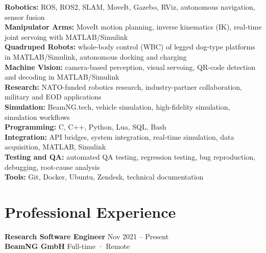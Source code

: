 \documentclass[11pt,a4paper]{article}
\begin{document}
{\small
\textbf{Robotics:} ROS, ROS2, SLAM, MoveIt, Gazebo, RViz, autonomous navigation, sensor fusion\\
\textbf{Manipulator Arms:} MoveIt motion planning, inverse kinematics (IK), real-time joint servoing with MATLAB/Simulink\\
\textbf{Quadruped Robots:} whole-body control (WBC) of legged dog-type platforms in MATLAB/Simulink, autonomous docking and charging\\
\textbf{Machine Vision:} camera-based perception, visual servoing, QR-code detection and decoding in MATLAB/Simulink\\
\textbf{Research:} NATO-funded robotics research, industry-partner collaboration, military and EOD applications\\
\textbf{Simulation:} BeamNG.tech, vehicle simulation, high-fidelity simulation, simulation workflows\\
\textbf{Programming:} C, C++, Python, Lua, SQL, Bash\\
\textbf{Integration:} API bridges, system integration, real-time simulation, data acquisition, MATLAB, Simulink\\
\textbf{Testing and QA:} automated QA testing, regression testing, bug reproduction, debugging, root-cause analysis\\
\textbf{Tools:} Git, Docker, Ubuntu, Zendesk, technical documentation
}

\section*{Professional Experience}

\textbf{Research Software Engineer} \hfill Nov 2021 -- Present\\
\textbf{BeamNG GmbH} \hfill Full-time · Remote
\end{document}

